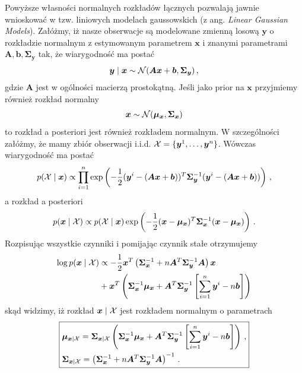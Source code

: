 \documentclass{myclass}
\numberwithin{equation}{subsection}
\begin{document}
Powyższe własności normalnych rozkładów łącznych pozwalają jawnie wnioskować w tzw. liniowych
modelach gaussowskich (z ang. \textit{Linear Gaussian Models}). Załóżmy, iż nasze obserwacje są
modelowane zmienną losową \(\bm{y}\) o rozkładzie normalnym z estymowanym parametrem \(\bm{x}\) i
znanymi parametrami \(\bm{A}, \bm{b}, \bm{\Sigma}_{\bm{y}}\) tak, że wiarygodność ma postać
\begin{equation}
    \bm{y} \mid \bm{x} \sim \mathcal{N}(\bm{A}\bm{x} + \bm{b}, \bm{\Sigma}_{\bm{y}})\,,
\end{equation}
gdzie \(\bm{A}\) jest w ogólności macierzą prostokątną. Jeśli jako prior na \(\bm{x}\) przyjmiemy
również rozkład normalny
\begin{equation}
    \bm{x} \sim \mathcal{N}(\bm{\mu}_{\bm{x}}, \bm{\Sigma}_{\bm{x}})
\end{equation}
to rozkład a posteriori jest również rozkładem normalnym. W szczególności załóżmy, że mamy zbiór
obserwacji i.i.d. \(\mathcal{X} = \{\bm{y}^1, \ldots, \bm{y}^n\}\). Wówczas wiarygodność ma postać
\begin{equation}
    p(\mathcal{X} \mid \bm{x}) \propto \prod_{i=1}^n \exp\left(-\frac{1}{2}(\bm{y}^i - (\bm{Ax}+\bm{b}))^T\bm{\Sigma}_{\bm{y}}^{-1}(\bm{y}^i - (\bm{Ax}+\bm{b}))\right)\,,
\end{equation}
a rozkład a posteriori
\begin{equation}
    p(\bm{x} \mid \mathcal{X}) \propto p(\mathcal{X} \mid \bm{x}) \exp\left(-\frac{1}{2}(\bm{x} - \bm{\mu}_{\bm{x}})^T\bm{\Sigma}_{\bm{x}}^{-1}(\bm{x} - \bm{\mu}_{\bm{x}})\right)\,.
\end{equation}
Rozpisując wszystkie czynniki i pomijając czynnik stałe otrzymujemy
\begin{equation}
    \begin{split}
        \log p(\bm{x} \mid \mathcal{X}) &\propto -\frac{1}{2}\bm{x}^T\left(\bm{\Sigma}_{\bm{x}}^{-1} + n\bm{A}^T\bm{\Sigma}_{\bm{y}}^{-1}\bm{A}\right)\bm{x}\\
        & + \bm{x}^T\left(\bm{\Sigma}_{\bm{x}}^{-1}\bm{\mu}_{\bm{x}} + \bm{A}^T\bm{\Sigma}_{\bm{y}}^{-1}\left[\sum_{i=1}^n\bm{y}^i - n\bm{b}\right]\right)
    \end{split}
\end{equation}
skąd widzimy, iż rozkład \(\bm{x} \mid \mathcal{X}\) jest rozkładem normalnym o parametrach
\begin{equation}\label{eq:linear_gauss}\boxed{
    \begin{split}
        &\bm{\mu}_{\bm{x} \mid \mathcal{X}} = \bm{\Sigma}_{\bm{x} \mid \mathcal{X}} \left(\bm{\Sigma}_{\bm{x}}^{-1}\bm{\mu}_{\bm{x}} + \bm{A}^T\bm{\Sigma}_{\bm{y}}^{-1}\left[\sum_{i=1}^n\bm{y}^i - n\bm{b}\right]\right) \,,\\
        &\bm{\Sigma}_{\bm{x} \mid \mathcal{X}} = \left(\bm{\Sigma}_{\bm{x}}^{-1} + n\bm{A}^T\bm{\Sigma}_{\bm{y}}^{-1}\bm{A}\right)^{-1}\,.
    \end{split}
}\end{equation}
\end{document}
